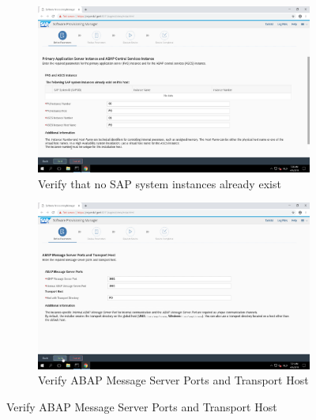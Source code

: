 \begin{figure}[!htb]\ContinuedFloat
    \begin{subfigure}{0.5\textwidth}
        \captionsetup{width=0.8\linewidth}
        \includegraphics[width=0.9\linewidth]{img/Methodologie/SAP14.png}
        \centering
        \caption{Verify that no SAP system instances already exist}
    \end{subfigure}
    \begin{subfigure}{0.5\textwidth}
        \captionsetup{width=0.8\linewidth}
        \includegraphics[width=0.9\linewidth]{img/Methodologie/SAP13.png} 
        \centering
        \caption{Verify ABAP Message Server Ports and Transport Host}
    \end{subfigure}
\end{figure}
